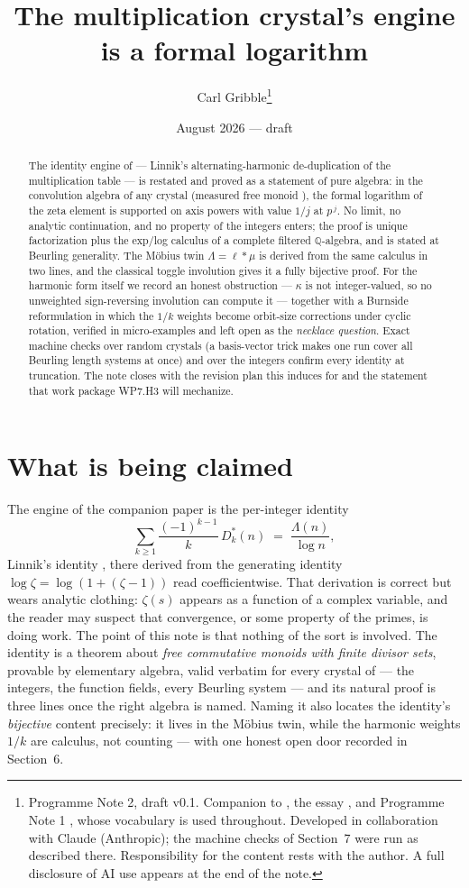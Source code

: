 \documentclass[11pt]{article}
\title{The multiplication crystal's engine is a formal logarithm}
\author{Carl Gribble\thanks{Programme Note 2, draft v0.1. Companion to
\cite{CompanionI,CompanionII,CompanionIII}, the essay \cite{Essay}, and Programme Note 1
\cite{Defs}, whose vocabulary is used throughout. Developed in collaboration with Claude
(Anthropic); the machine checks of Section~7 were run as described there. Responsibility for the
content rests with the author. A full disclosure of AI use appears at the end of the note.}}
\date{August 2026 --- draft}
\theoremstyle{remark}
\newcommand{\Q}{\mathbb{Q}}
\begin{document}
\maketitle

\begin{abstract}
The identity engine of \cite{CompanionI} --- Linnik's alternating-harmonic de-duplication of the
multiplication table --- is restated and proved as a statement of pure algebra: in the convolution
algebra of any crystal (measured free monoid \cite{Defs}), the formal logarithm of the zeta element
is supported on axis powers with value $1/j$ at $p^{\,j}$. No limit, no analytic continuation, and
no property of the integers enters; the proof is unique factorization plus the exp/log calculus of
a complete filtered $\Q$-algebra, and is stated at Beurling generality. The M\"obius twin
$\Lambda = \ell * \mu$ is derived from the same calculus in two lines, and the classical toggle
involution gives it a fully bijective proof. For the harmonic form itself we record an honest
obstruction --- $\kappa$ is not integer-valued, so no unweighted sign-reversing involution can
compute it --- together with a Burnside reformulation in which the $1/k$ weights become orbit-size
corrections under cyclic rotation, verified in micro-examples and left open as the \emph{necklace
question}. Exact machine checks over random crystals (a basis-vector trick makes one run cover all
Beurling length systems at once) and over the integers confirm every identity at truncation. The
note closes with the revision plan this induces for \cite{CompanionI} and the statement that work
package WP7.H3 will mechanize.
\end{abstract}

\section{What is being claimed}

The engine of the companion paper \cite{CompanionI} is the per-integer identity
\[
\sum_{k \ge 1} \frac{(-1)^{k-1}}{k}\, D_k^*(n) \;=\; \frac{\Lambda(n)}{\log n},
\]
Linnik's identity \cite{Linnik}, there derived from the generating identity
$\log \zeta = \log(1 + (\zeta - 1))$ read coefficientwise. That derivation is correct but wears
analytic clothing: $\zeta(s)$ appears as a function of a complex variable, and the reader may
suspect that convergence, or some property of the primes, is doing work. The point of this note is
that nothing of the sort is involved. The identity is a theorem about \emph{free commutative
monoids with finite divisor sets}, provable by elementary algebra, valid verbatim for every crystal
of \cite{Defs} --- the integers, the function fields, every Beurling system --- and its natural
proof is three lines once the right algebra is named. Naming it also locates the identity's
\emph{bijective} content precisely: it lives in the M\"obius twin, while the harmonic weights
$1/k$ are calculus, not counting --- with one honest open door recorded in Section~6.
\end{document}
